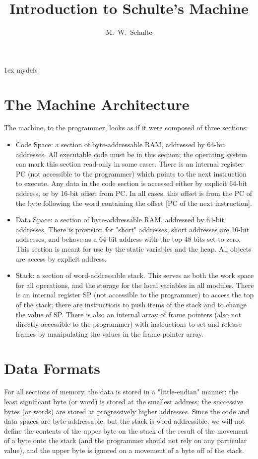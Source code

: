 \documentclass{article}
\author {M.~W.~Schulte}
\title {Introduction to Schulte's Machine}
\begin{document}
 \parindent 0pt \parskip 1ex
 {mydefs}\fullpage
\section{The Machine Architecture}
The machine, to the programmer, looks as if it were composed of 
three sections:\begin {itemize}
\item Code Space: 
a section of byte-addressable RAM, addressed by 64-bit addresses.  
All executable code must be in this section; the operating 
system can mark this section read-only in some cases.  
There is an internal register PC (not accessible to the programmer) 
which points to the next instruction to execute.  
Any data in the code section is accessed
either by explicit 64-bit address, or by 16-bit offset from PC.  
In all cases, this offset is from the PC of the byte following the word
containing the offset [PC of the next instruction].
\item Data Space: 
a section of byte-addressable RAM, addressed by 64-bit addresses. 
There is provision for "short" addresses;  short addresses are 16-bit 
addresses, and behave as a 64-bit address with the top 48 bits set to zero.
This section is meant for use by the static variables and the heap.  
All objects are access by explicit address.  
\item Stack: a section of word-addressable stack.  
This serves as both the work space for all operations, and the storage 
for the local variables in all modules.  
There is an internal register SP (not accessible to the programmer) 
to access the top of the stack; there are instructions to 
push items of the stack and to change the value of SP.  
There is also an internal array of frame pointers (also not directly 
accessible to the programmer) with instructions to set and release frames 
by manipulating the values in the frame pointer array.
\end{itemize}

\section{Data Formats}
For all sections of memory, the data is stored in a "little-endian" manner:
the least significant byte (or word) is stored at the smallest address;
the successive bytes (or words) are stored at progressively higher
addresses.  Since the code and data spaces are byte-addressable, but the
stack is word-addressible, we will not define the contents of the upper
byte on the stack of the result of the movement of a byte onto the stack 
(and the programmer should not rely on any particular value), 
and the upper byte is ignored on a movement of a byte off of the stack.
\end{document}
